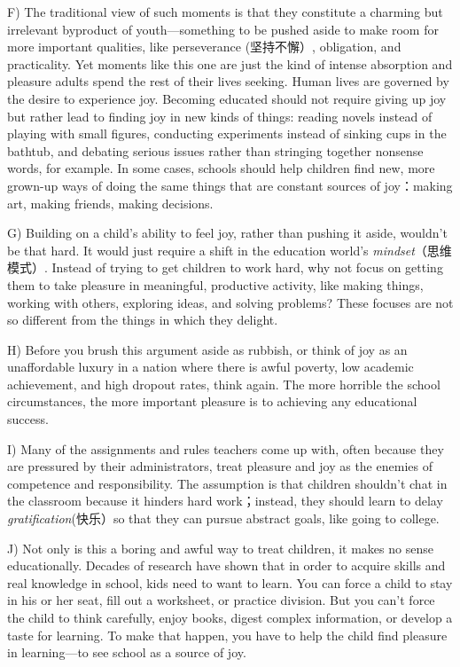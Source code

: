 \documentclass[UTF8,11pt]{ctexart}
\begin{document}
F) The traditional view of such moments is that they constitute a charming but irrelevant byproduct of youth—something to be pushed aside to make room for more important qualities, like perseverance (坚持不懈）, obligation, and practicality. Yet moments like this one are just the kind of intense absorption and pleasure adults spend the rest of their lives seeking. Human lives are governed by the desire to experience joy. Becoming educated should not require giving up joy but rather lead to finding joy in new kinds of things: reading novels instead of playing with small figures, conducting experiments instead of sinking cups in the bathtub, and debating serious issues rather than stringing together nonsense words, for example. In some cases, schools should help children find new, more grown-up ways of doing the same things that are constant sources of joy：making art, making friends, making decisions.


G) Building on a child’s ability to feel joy, rather than pushing it aside, wouldn’t be that hard. It would just require a shift in the education world’s\textit{ mindset}（思维模式）. Instead of trying to get children to work hard, why not focus on getting them to take pleasure in meaningful, productive activity, like making things, working with others, exploring ideas, and solving problems? These focuses are not so different from the things in which they delight.


H) Before you brush this argument aside as rubbish, or think of joy as an unaffordable luxury in a nation where there is awful poverty, low academic achievement, and high dropout rates, think again. The more horrible the school circumstances, the more important pleasure is to achieving any educational success.


I) Many of the assignments and rules teachers come up with, often because they are pressured by their administrators, treat pleasure and joy as the enemies of competence and responsibility. The assumption is that children shouldn’t chat in the classroom because it hinders hard work；instead, they should learn to delay\textit{ gratification}(快乐）so that they can pursue abstract goals, like going to college.


J) Not only is this a boring and awful way to treat children, it makes no sense educationally. Decades of research have shown that in order to acquire skills and real knowledge in school, kids need to want to learn. You can force a child to stay in his or her seat, fill out a worksheet, or practice division. But you can’t force the child to think carefully, enjoy books, digest complex information, or develop a taste for learning. To make that happen, you have to help the child find pleasure in learning—to see school as a source of joy.
\end{document}
